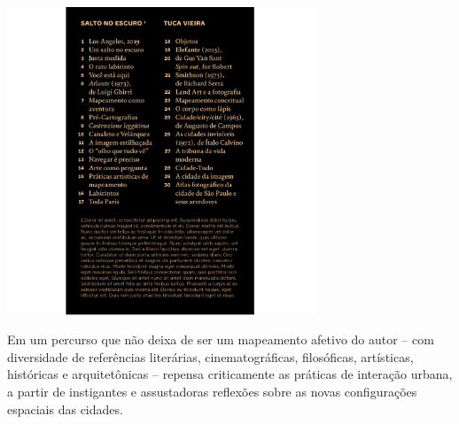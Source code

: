 \hspace*{-.4cm}\begin{minipage}[c]{.5\linewidth}
\small{
{}}
\end{minipage}


\pagebreak %

\begin{center}
\hspace*{.5cm}\includegraphics[width=92mm]{./grid/tuca.png}
\end{center}

\hspace*{-7cm}\hrulefill\hspace*{-7cm}

\medskip

\noindent{}Em um percurso que não deixa de ser um mapeamento afetivo do autor – com diversidade de referências literárias, cinematográficas, filosóficas, artísticas, históricas e arquitetônicas – {} repensa criticamente as práticas de interação urbana, a partir de instigantes e assustadoras reflexões sobre as novas configurações espaciais das cidades.

